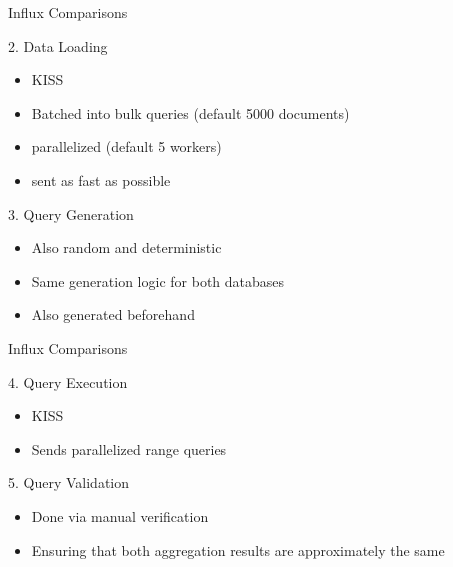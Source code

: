 \documentclass[compress,aspectratio=169]{beamer}
\begin{document}
\begin{frame}{Influx Comparisons}
\begin{block}{2. Data Loading}
  \begin{itemize}
    \item KISS
    \item Batched into bulk queries (default 5000 documents)
    \item parallelized (default 5 workers)
    \item sent as fast as possible
  \end{itemize}
\end{block}
\pause
\begin{block}{3. Query Generation}
  \begin{itemize}
    \item Also random and deterministic
    \item Same generation logic for both databases
    \item Also generated beforehand
  \end{itemize}
\end{block}
\end{frame}


\begin{frame}{Influx Comparisons}
\begin{block}{4. Query Execution}
  \begin{itemize}
    \item KISS
    \item Sends parallelized range queries
  \end{itemize}
\end{block}
\pause
\begin{block}{5. Query Validation}
  \begin{itemize}
    \item Done via manual verification
    \item Ensuring that both aggregation results are approximately the same
  \end{itemize}
\end{block}
\end{frame}
\end{document}
